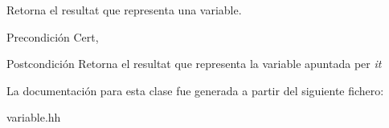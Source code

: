 Retorna el resultat que representa una variable. 

\begin{DoxyPrecond}{Precondición}
Cert, 
\end{DoxyPrecond}
\begin{DoxyPostcond}{Postcondición}
Retorna el resultat que representa la variable apuntada per {\itshape it} 
\end{DoxyPostcond}


La documentación para esta clase fue generada a partir del siguiente fichero\+:\begin{DoxyCompactItemize}
\item 
variable.\+hh\end{DoxyCompactItemize}
